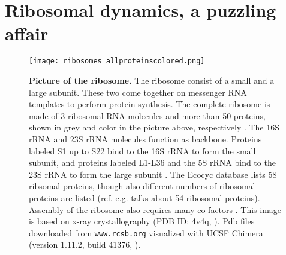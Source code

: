 



\chapter{Ribosomal dynamics, a puzzling affair}
\label{chapter:ribosomes}



\begin{figure}
    \centering    
    \texttt{[image: ribosomes\_allproteinscolored.png]}
    \caption{ 
        \textbf{Picture of the ribosome.}
        The ribosome consist of a small and a large subunit. These two come together on messenger RNA templates to perform protein synthesis.
        The complete ribosome is made of 3 ribosomal RNA molecules and more than 50 proteins, shown in grey and color in the picture above, respectively \cite{Chen2013}.
        The 16S rRNA and 23S rRNA molecules function as backbone. %
        Proteins labeled S1 up to S22 
        bind to the 16S rRNA to form the small subunit, and proteins labeled L1-L36 and the 5S rRNA bind to the 23S rRNA to form the large subunit \cite{Keseler2017}.
        The Ecocyc database lists 58 ribsomal proteins, though also different numbers of ribosomal proteins are listed (ref. \cite{Chen2013} e.g. talks about 54 ribosomal proteins).
        Assembly of the ribosome also requires many co-factors \cite{Chen2013}. %
        This image is based on x-ray crystallography (PDB ID: 4v4q, \cite{Schuwirth2005}). Pdb files downloaded from \texttt{www.rcsb.org} \cite{Berman2000} 
        visualized with UCSF Chimera (version 1.11.2, build 41376, \cite{pettersen2004}).
    }
    \label{fig:ribo:pictureofribo}
\end{figure}

